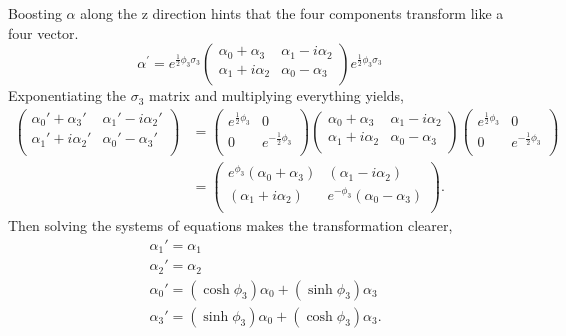 \documentclass[12pt]{article}
\begin{document}
Boosting $\alpha$ along the z direction hints that the four components transform like a four vector.  
\begin{equation}
\alpha^{'} = e^{\frac{1}{2}\phi_3 \sigma_3} 
\begin{pmatrix}
\alpha_0 + \alpha_3 & \alpha_1 - i\alpha_2 \\
\alpha_1 + i\alpha_2 & \alpha_0 - \alpha_3 \\
\end{pmatrix}
e^{\frac{1}{2}\phi_3 \sigma_3}
\end{equation}
Exponentiating the $\sigma_3$ matrix and multiplying everything yields,
\begin{equation}
\begin{split}
\begin{pmatrix}
\alpha_0' + \alpha_3' & \alpha_1' - i\alpha_2' \\
\alpha_1' + i\alpha_2' & \alpha_0' - \alpha_3' \\
\end{pmatrix}
&=
\begin{pmatrix}
e^{\frac{1}{2}\phi_3} & 0 \\
0 & e^{-\frac{1}{2}\phi_3} \\
\end{pmatrix}
\begin{pmatrix}
\alpha_0 + \alpha_3 & \alpha_1 - i\alpha_2 \\
\alpha_1 + i\alpha_2 & \alpha_0 - \alpha_3 \\
\end{pmatrix}
\begin{pmatrix}
e^{\frac{1}{2}\phi_3} & 0 \\
0 & e^{-\frac{1}{2}\phi_3} \\
\end{pmatrix} \\
&=
\begin{pmatrix}
e^{\phi_3}(\alpha_0 + \alpha_3) & (\alpha_1 - i\alpha_2) \\
(\alpha_1 + i\alpha_2) & e^{-\phi_3}(\alpha_0 - \alpha_3) \\
\end{pmatrix}.
\end{split}
\end{equation}
Then solving the systems of equations makes the transformation clearer,
\begin{equation}
\begin{split}
&\alpha_1' = \alpha_1 \\
&\alpha_2' = \alpha_2 \\
&\alpha_0' = (\cosh\phi_3) \alpha_0 +  (\sinh\phi_3) \alpha_3 \\ 
&\alpha_3' = (\sinh\phi_3) \alpha_0 +  (\cosh\phi_3) \alpha_3. \\ 
\end{split}
\end{equation}
\end{document}
